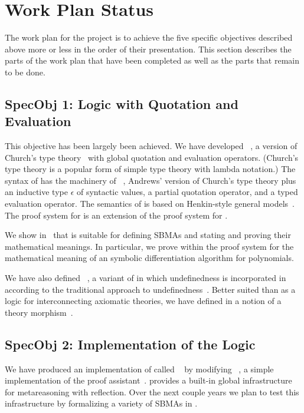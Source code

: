 \documentclass[fleqn]{llncs}
\begin{document}
\ei


\section{Work Plan Status}

The work plan for the project is to achieve the five specific
objectives described above more or less in the order of their
presentation.  This section describes the parts of the work plan that
have been completed as well as the parts that remain to be done.

\subsection*{SpecObj 1: Logic with Quotation and Evaluation}

This objective has been largely been achieved.  We have developed
{\churchqe}~\cite{Farmer18}, a version of Church's type
theory~\cite{Church40} with global quotation and evaluation operators.
(Church's type theory is a popular form of simple type theory with
lambda notation.)  The syntax of {\churchqe} has the machinery of
{\qzero}~\cite{Andrews02}, Andrews' version of Church's type theory
plus an inductive type $\epsilon$ of syntactic values, a partial
quotation operator, and a typed evaluation operator.  The semantics of
{\churchqe} is based on Henkin-style general models~\cite{Henkin50}.
The proof system for {\churchqe} is an extension of the proof system
for {\qzero}.

We show in~\cite{Farmer18} that {\churchqe} is suitable for defining
SBMAs and stating and proving their mathematical meanings.  In
particular, we prove within the proof system for {\churchqe} the
mathematical meaning of an symbolic differentiation algorithm for
polynomials.

We have also defined {\churchuqe}~\cite{Farmer17}, a variant of
{\churchqe} in which undefinedness is incorporated in {\churchqe}
according to the traditional approach to
undefinedness~\cite{Farmer04}.  Better suited than {\churchqe} as a
logic for interconnecting axiomatic theories, we have defined in
{\churchuqe} a notion of a theory morphism~\cite{Farmer17}.

\subsection*{SpecObj 2: Implementation of the Logic}

We have produced an implementation of {\churchqe} called
{\HLQE}~\cite{CaretteFarmerLaskowski18} by modifying
{\HL}~\cite{Harrison09}, a simple implementation of the {\HOL} proof
assistant~\cite{GordonMelham93}.  {\HLQE} provides a built-in global
infrastructure for metareasoning with reflection.  Over the next
couple years we plan to test this infrastructure by formalizing a
variety of SBMAs in {\HLQE}.
\end{document}
